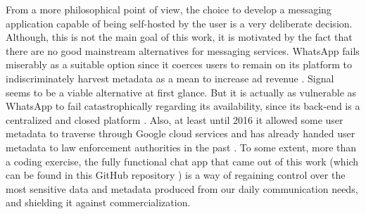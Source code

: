 From a more philosophical point of view, the choice to develop a messaging application capable of being self-hosted by the user is a very deliberate decision. Although, this is not the main goal of this work, it is motivated by the fact that there are no good mainstream alternatives for messaging services. WhatsApp fails miserably as a suitable option since it coerces users to remain on its platform to indiscriminately harvest metadata as a mean to increase ad revenue \cite{Kumar2021}. Signal seems to be a viable alternative at first glance. But it is actually as vulnerable as WhatsApp to fail catastrophically regarding its availability, since its back-end is a centralized and closed platform \cite{Hodgson2020}. Also, at least until 2016 it allowed some user metadata to traverse through Google cloud services \cite{Edge2016} and has already handed user metadata to law enforcement authorities in the past \cite{Kaufman2016}. To some extent, more than a coding exercise, the fully functional chat app that came out of this work (which can be found in this GitHub repository \cite{Rodriguez2022}) is a way of regaining control over the most sensitive data and metadata produced from our daily communication needs, and shielding it against commercialization.